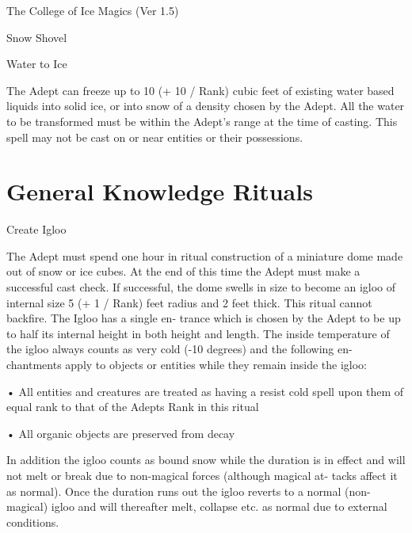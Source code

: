 \begin{Chapter}{The College of Ice Magics (Ver 1.5)}
\begin{spell}[G-7]{Snow Shovel }
\begin{effects}
\end{effects}
\end{spell}

\begin{spell}[G-8]{Water to Ice }

\begin{effects}
 The  Adept  can  freeze  up  to  10  (+  10  / 
Rank)  cubic  feet  of  existing  water  based  liquids 
into solid ice, or into snow of a density chosen by 
the Adept. All the water to be transformed must be 
within  the  Adept’s  range  at  the  time  of  casting. 
This  spell  may  not  be  cast  on  or  near  entities  or 
their possessions. 


\end{effects}
\end{spell}

\section{General Knowledge Rituals}

\begin{ritual}[Q-1]{Create Igloo }

\begin{effects}
 The  Adept  must  spend  one  hour  in  ritual 
construction of a miniature dome made out of snow 
or ice cubes. At the end of this time the Adept must 
make  a  successful  cast  check.  If  successful,  the 
dome swells in size to become an igloo of internal 
size 5 (+ 1 / Rank) feet radius and 2 feet thick. This 
ritual  cannot  backfire.  The  Igloo  has  a  single  en-
trance  which  is  chosen  by  the  Adept  to  be  up  to 
half  its  internal  height  in  both  height  and  length. 
The  inside  temperature  of  the  igloo  always  counts 
as  very  cold  (-10  degrees)  and  the  following  en-
chantments  apply  to  objects  or  entities  while  they 
remain inside the igloo:  

•  All  entities  and  creatures  are  treated  as  having  a 
resist cold spell upon them of equal rank to that of 
the Adepts Rank in this ritual  

• All organic objects are preserved from decay 

In  addition  the  igloo  counts  as  bound  snow  while 
the duration is in effect and will not melt or break 
due  to  non-magical  forces  (although  magical  at-
tacks  affect  it  as  normal).  Once  the  duration  runs 
out  the  igloo  reverts  to  a  normal  (non-magical) 
igloo  and  will  thereafter  melt,  collapse  etc.  as 
normal due to external conditions. 



\end{effects}
\end{ritual}
\end{Chapter}
